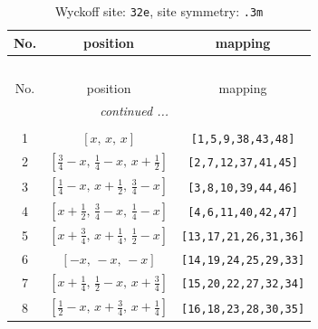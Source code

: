 \documentclass[fleqn,8pt]{jsarticle}
\begin{document}
\renewcommand{\arraystretch}{1.2}
\begin{longtable}{ccc}
\caption{Wyckoff site: {\tt 32e}, site symmetry: {\tt .3m}}
 \\
 \hline \hline
No. & position & mapping \\ \hline \endfirsthead

\multicolumn{2}{l}{\tablename\ \thetable{}} \\
 \hline \hline
No. & position & mapping \\ \hline \endhead

 \hline \hline
\multicolumn{2}{r}{\footnotesize\it continued ...} \\ \endfoot

 \hline \hline
\multicolumn{2}{r}{} \\ \endlastfoot

1 & $\left[ x,\, x,\, x \right]$ & {\tt [1,5,9,38,43,48]} \\ \hline
2 & $\left[ \frac{3}{4} - x,\, \frac{1}{4} - x,\, x + \frac{1}{2} \right]$ & {\tt [2,7,12,37,41,45]} \\ \hline
3 & $\left[ \frac{1}{4} - x,\, x + \frac{1}{2},\, \frac{3}{4} - x \right]$ & {\tt [3,8,10,39,44,46]} \\ \hline
4 & $\left[ x + \frac{1}{2},\, \frac{3}{4} - x,\, \frac{1}{4} - x \right]$ & {\tt [4,6,11,40,42,47]} \\ \hline
5 & $\left[ x + \frac{3}{4},\, x + \frac{1}{4},\, \frac{1}{2} - x \right]$ & {\tt [13,17,21,26,31,36]} \\ \hline
6 & $\left[ - x,\, - x,\, - x \right]$ & {\tt [14,19,24,25,29,33]} \\ \hline
7 & $\left[ x + \frac{1}{4},\, \frac{1}{2} - x,\, x + \frac{3}{4} \right]$ & {\tt [15,20,22,27,32,34]} \\ \hline
8 & $\left[ \frac{1}{2} - x,\, x + \frac{3}{4},\, x + \frac{1}{4} \right]$ & {\tt [16,18,23,28,30,35]} \\
\end{longtable}
\renewcommand{\arraystretch}{1.2}
\end{document}
